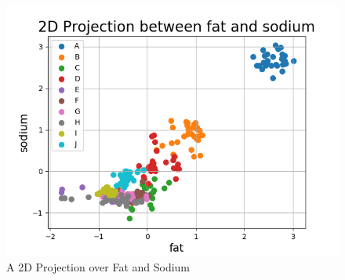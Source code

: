 \documentclass[preprint,12pt]{elsarticle}
\begin{document}
\begin{figure}[hb]
	\centering
    \centerline{\includegraphics[scale=0.6]{figs/fat_sodium.png}}
    \caption{A 2D Projection over Fat and Sodium}\label{fig:fat_sodium.png}
\end{figure}
\end{document}
